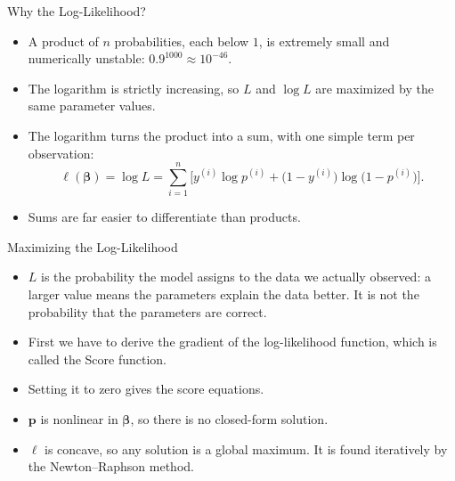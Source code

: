 \begin{frame}{Why the Log-Likelihood?}
    \begin{itemize}
        \item A product of $n$ probabilities, each below $1$, is extremely small and numerically unstable: $0.9^{1000} \approx 10^{-46}$.
        \item The logarithm is strictly increasing, so $L$ and $\log L$ are maximized by the same parameter values.
        \item The logarithm turns the product into a sum, with one simple term per observation:
        \[
            \ell(\symbf{\beta}) = \log L = \sum_{i=1}^{n} \Big[ y^{(i)} \log p^{(i)} + \big(1 - y^{(i)}\big) \log \big(1 - p^{(i)}\big) \Big].
        \]
        \item Sums are far easier to differentiate than products.
    \end{itemize}
\end{frame}


        


\begin{frame}{Maximizing the Log-Likelihood}
    \begin{itemize}
        \item $L$ is the probability the model assigns to the data we actually observed: a larger value means the parameters explain the data better. It is not the probability that the parameters are correct.
        \item First we have to derive the gradient of the log-likelihood function, which is called the Score function.
        \item Setting it to zero gives the score equations.
        \item $\mathbf{p}$ is nonlinear in $\symbf{\beta}$, so there is no closed-form solution.
        \item $\ell$ is concave, so any solution is a global maximum. It is found iteratively by the Newton--Raphson method.
    \end{itemize}
\end{frame}


